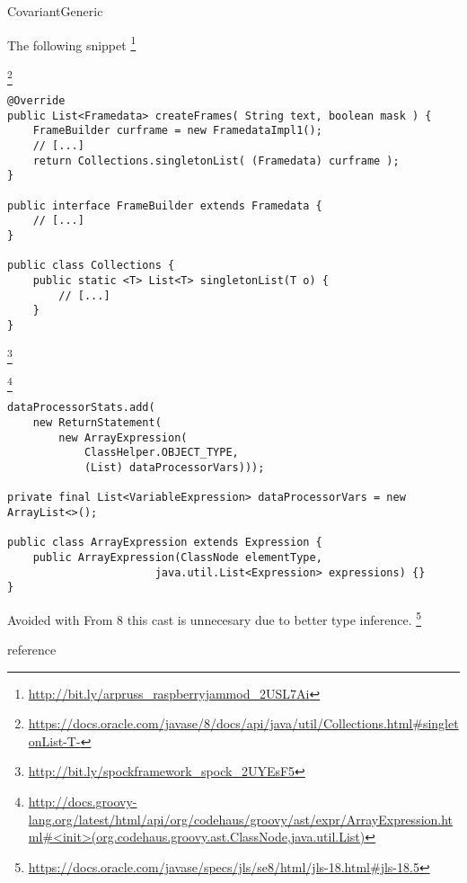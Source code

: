 \begin{pattern}{CovariantGeneric}

\instances{}
The following snippet%
\footnote{\url{http://bit.ly/arpruss_raspberryjammod_2USL7Ai}}


\footnote{\url{https://docs.oracle.com/javase/8/docs/api/java/util/Collections.html\#singletonList-T-}}

\begin{verbatim}
@Override
public List<Framedata> createFrames( String text, boolean mask ) {
    FrameBuilder curframe = new FramedataImpl1();
    // [...]
    return Collections.singletonList( (Framedata) curframe );
}

public interface FrameBuilder extends Framedata {
    // [...]
}

public class Collections {
    public static <T> List<T> singletonList(T o) {
        // [...]
    }
}
\end{verbatim}

\footnote{\url{http://bit.ly/spockframework_spock_2UYEsF5}}

\footnote{\url{http://docs.groovy-lang.org/latest/html/api/org/codehaus/groovy/ast/expr/ArrayExpression.html\#<init>(org.codehaus.groovy.ast.ClassNode,java.util.List)}}

\begin{verbatim}
dataProcessorStats.add(
    new ReturnStatement(
        new ArrayExpression(
            ClassHelper.OBJECT_TYPE,
            (List) dataProcessorVars)));

private final List<VariableExpression> dataProcessorVars = new ArrayList<>();

public class ArrayExpression extends Expression {
    public ArrayExpression(ClassNode elementType,
                       java.util.List<Expression> expressions) {}
}
\end{verbatim}

\detection{}

\discussion{}

Avoided with
From \java{} 8 this cast is unnecesary due to better type inference.
\footnote{\url{https://docs.oracle.com/javase/specs/jls/se8/html/jls-18.html\#jls-18.5}}

reference \cite{altidorTamingWildcardsCombining2011}

\related{}

\end{pattern}